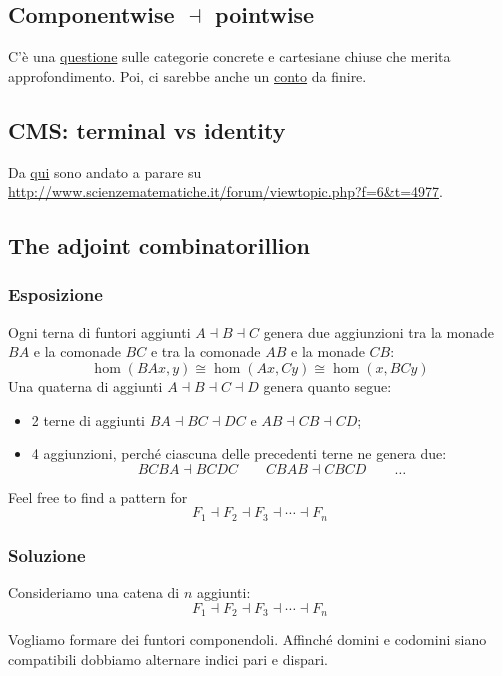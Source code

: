\subsection*{Componentwise $\dashv$ pointwise}
C'è una \hyperlink{componentwise-pointwise}{questione} sulle categorie concrete e cartesiane chiuse che merita approfondimento. Poi, ci sarebbe anche un \hyperlink{p2c-lipshitz}{conto} da finire.




\subsection*{CMS: terminal vs identity}

Da \hyperlink{terminal-identity}{qui} sono andato a parare su \url{http://www.scienzematematiche.it/forum/viewtopic.php?f=6&t=4977}.




\subsection*{The adjoint combinatorillion}

\subsubsection*{Esposizione}

Ogni terna di funtori aggiunti $A\dashv B\dashv C$ genera due aggiunzioni tra la monade $BA$ e la comonade $BC$ e tra la comonade $AB$ e la monade $CB$:
\[
\hom(BAx, y)\cong \hom(Ax, Cy)\cong \hom(x, BCy)
\]
Una quaterna di aggiunti $A\dashv B\dashv C\dashv D$ genera quanto segue:
\begin{itemize}
\item 2 terne di aggiunti $BA\dashv BC\dashv DC$ e $AB\dashv CB\dashv CD$;
\item 4 aggiunzioni, perch\'e ciascuna delle precedenti terne ne genera due:
\[
BCBA\dashv BCDC\qquad CBAB\dashv CBCD\qquad\dots
\]
\end{itemize}
Feel free to find a pattern for
\[
F_1\dashv F_2\dashv F_3\dashv\cdots \dashv F_n
\]

\subsubsection*{Soluzione}

Consideriamo una catena di $n$ aggiunti:
\[
F_1\dashv F_2\dashv F_3\dashv\cdots \dashv F_n
\]

Vogliamo formare dei funtori componendoli.
Affinché domini e codomini siano compatibili dobbiamo alternare indici pari e dispari.

